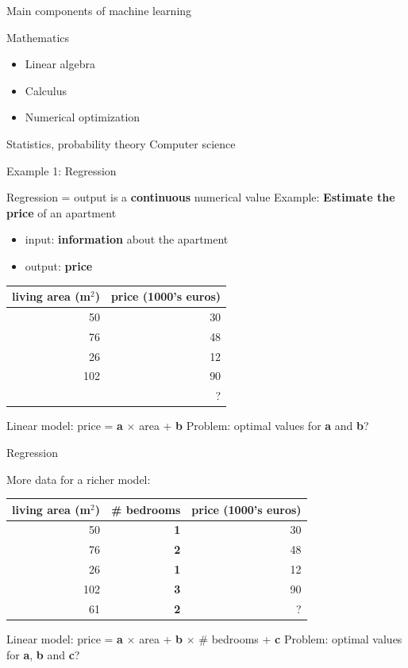 \documentclass{beamer}
\begin{document}
\begin{frame}{Main components of machine learning}

\vfill
Mathematics
\begin{itemize}
	\item Linear algebra
	\item Calculus
	\item Numerical optimization
\end{itemize}
\vfill
Statistics, probability theory
\vfill
Computer science
\vfill

\end{frame}

\begin{frame}{Example 1: Regression}

Regression = output is a \textbf{continuous} numerical value
\vfill
Example: \textbf{Estimate the price} of an apartment
\begin{itemize}
	\item input: \textbf{information} about the apartment
	\item output: \textbf{price}
\end{itemize}
\vfill
\pause
\begin{table}
\centering
\begin{tabular}{r|r}
living area (m$^2$) & price (1000's euros) \\\hline
50 & 30 \\
76 & 48 \\
26 & 12 \\
102 & 90 \\
\pause
61 & ?
\end{tabular}
\end{table}
\vfill
Linear model: price = \textbf{a} $\times$ area + \textbf{b}
\vfill
Problem: optimal values for \textbf{a} and \textbf{b}?

\end{frame}

\begin{frame}{Regression}

More data for a richer model:
\vfill
\begin{table}
\centering
\begin{tabular}{r|r|r}
living area (m$^2$) &  \textbf{\# bedrooms} & price (1000's euros) \\\hline
50 & \textbf{1} & 30\\
76 & \textbf{2} & 48\\
26 & \textbf{1} & 12\\
102 & \textbf{3} & 90\\
61 & \textbf{2} & ?
\end{tabular}
\end{table}

\vfill
Linear model: price = \textbf{a} $\times$ area + \textbf{b} $\times$ \# bedrooms + \textbf{c}
\vfill
Problem: optimal values for \textbf{a}, \textbf{b} and \textbf{c}?
\end{frame}
\end{document}
